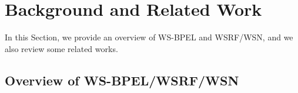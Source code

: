 

\section{Background and Related Work}\label{relwork}

In this Section, we provide an overview of  WS-BPEL and WSRF/WSN,
and we also review some related works.

\subsection{Overview of WS-BPEL/WSRF/WSN}\label{BPEL/WSRF}

